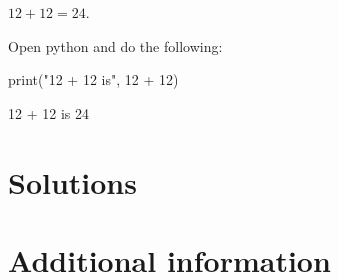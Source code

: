 \documentclass[oneside]{book}
\begin{document}
\begin{solution}
  \(12 + 12 = 24\).
\end{solution}

\begin{additionalinformation}
Open python and do the following:

\begin{pycell}
print("12 + 12 is", 12 + 12)
\end{pycell}
\begin{pyexpectedoutput}
12 + 12 is 24
\end{pyexpectedoutput}
\end{additionalinformation}

\chapter{Solutions}

\chapter{Additional information}

\SaveReplacements
\end{document}
